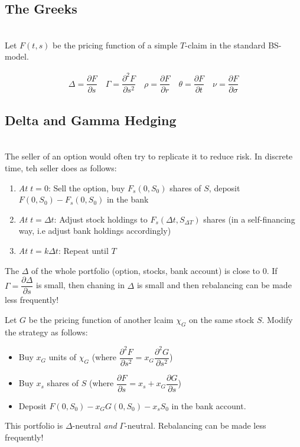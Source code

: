 \subsection{The Greeks}\hfill\\
\noindent Let $F(t,s)$ be the pricing function of a simple $T$-claim in the standard BS-model.
\par\bigskip
\begin{defo}[]{}
  \begin{equation*}
    \begin{gathered}
      \Delta = \dfrac{\partial F}{\partial s}\quad \Gamma = \dfrac{\partial^2F}{\partial s^2}\quad \rho = \dfrac{\partial F}{\partial r}\quad \theta = \dfrac{\partial F}{\partial t}\quad\nu= \dfrac{\partial F}{\partial \sigma}
    \end{gathered}
  \end{equation*}
\end{defo}
\par\bigskip
\subsection{Delta and Gamma Hedging}\hfill\\
\noindent The seller of an option would often try to replicate it to reduce risk. In discrete time, teh seller does as follows:\par
\begin{enumerate}[leftmargin=*]
  \item\textit{At $t=0$}: Sell the option, buy $F_s(0,S_0)$ shares of $S$, deposit $F(0,S_0)-F_s(0,S_0)$ in the bank
  \item\textit{At $t=\Delta t$}: Adjust stock holdings to $F_s(\Delta t,S_{\Delta T})$ shares (in a self-financing way, i.e adjust bank holdings accordingly)
  \item\textit{At $t=k\Delta t$}: Repeat until $T$
\end{enumerate}\par
\noindent The $\Delta$ of the whole portfolio (option, stocks, bank account) is close to 0. If $\Gamma = \dfrac{\partial \Delta}{\partial s}$ is small, then chaning in $\Delta$ is small and then rebalancing can be made less frequently!
\par\bigskip
\noindent Let $G$ be the pricing function of another lcaim $\chi_G$ on the same stock $S$. Modify the strategy as follows:\par
\begin{itemize}
  \item Buy $x_G$ units of $\chi_G$ (where $\dfrac{\partial^2 F}{\partial s^2} = x_G\dfrac{\partial^2 G}{\partial s^2}$)
  \item Buy $x_s$ shares of $S$ (where $\dfrac{\partial F}{\partial s} = x_s+x_G\dfrac{\partial G}{\partial s}$)
  \item Deposit $F(0,S_0)-x_GG(0,S_0)-x_sS_0$ in the bank account.
\end{itemize}\par
\noindent This portfolio is $\Delta$-neutral \textit{and} $\Gamma$-neutral. Rebalancing can be made less frequently!

